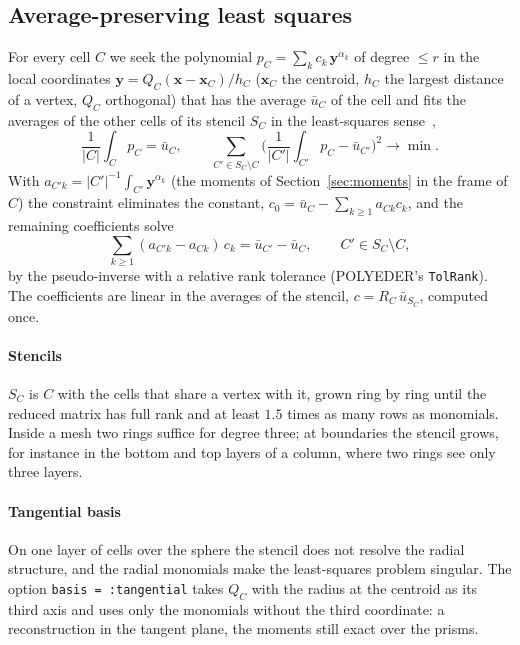 \documentclass[preprint,12pt]{elsarticle}
\newcommand{\bx}{\mathbf{x}}
\newcommand{\by}{\mathbf{y}}
\newcommand{\code}[1]{\texttt{#1}}
\theoremstyle{definition}
\begin{document}
\subsection{Average-preserving least squares}
For every cell $C$ we seek the polynomial $p_C=\sum_k c_k\,\by^{\alpha_k}$ of degree $\le r$ in the
local coordinates $\by = Q_C(\bx-\bx_C)/h_C$ ($\bx_C$ the centroid, $h_C$ the largest distance of a
vertex, $Q_C$ orthogonal) that has the average $\bar u_C$ of the cell and fits the averages of the
other cells of its stencil $S_C$ in the least-squares sense~\cite{Barth1990,OllivierGooch2002},
\begin{equation}
\frac{1}{|C|}\int_C p_C = \bar u_C,\qquad \sum_{C'\in S_C\setminus C}
\Big(\frac{1}{|C'|}\int_{C'} p_C - \bar u_{C'}\Big)^2 \to \min .
\end{equation}
With $a_{C'k} = |C'|^{-1}\int_{C'}\by^{\alpha_k}$ (the moments of Section~\ref{sec:moments} in the frame
of $C$) the constraint eliminates the constant, $c_0 = \bar u_C - \sum_{k\ge1}a_{Ck}c_k$, and the
remaining coefficients solve
\begin{equation}
\sum_{k\ge1}(a_{C'k}-a_{Ck})\,c_k = \bar u_{C'}-\bar u_C,\qquad C'\in S_C\setminus C ,
\end{equation}
by the pseudo-inverse with a relative rank tolerance (POLYEDER's \code{TolRank}). The coefficients are
linear in the averages of the stencil, $c = R_C\,\bar u_{S_C}$, computed once.

\paragraph{Stencils} $S_C$ is $C$ with the cells that share a vertex with it, grown ring by ring
until the reduced matrix has full rank and at least $1.5$ times as many rows as monomials. Inside a
mesh two rings suffice for degree three; at boundaries the stencil grows, for instance in the bottom
and top layers of a column, where two rings see only three layers.

\paragraph{Tangential basis} On one layer of cells over the sphere the stencil does not resolve the
radial structure, and the radial monomials make the least-squares problem singular. The option
\code{basis = :tangential} takes $Q_C$ with the radius at the centroid as its third axis and uses only
the monomials without the third coordinate: a reconstruction in the tangent plane, the moments still
exact over the prisms.
\end{document}
